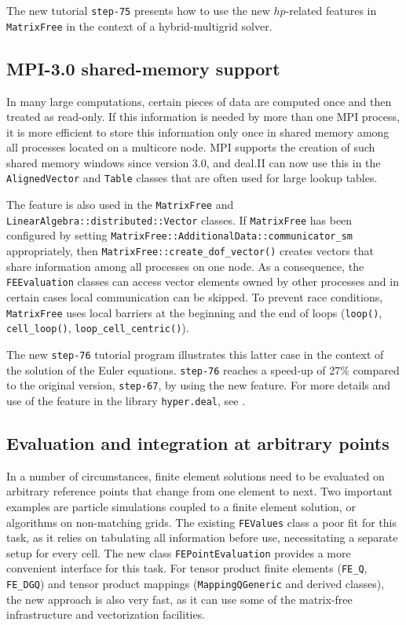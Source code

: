 \documentclass{ansarticle-preprint}
\begin{document}
The new tutorial \texttt{step-75} presents how to use the new $hp$-related features in \texttt{MatrixFree}
in the context of a hybrid-multigrid solver.



\subsection{MPI-3.0 shared-memory support}
In many large computations, certain pieces of data are computed once
and then treated as read-only. If this information is needed by more
than one MPI process, it is more efficient to store this information only
once in shared memory among all processes located on a multicore
node. MPI supports the creation of such shared memory windows since
version 3.0, and deal.II can now use this in the
\texttt{AlignedVector} and \texttt{Table} classes that are often used
for large lookup tables.

The feature is also used in the \texttt{MatrixFree} and
\texttt{LinearAlgebra::\allowbreak distributed::\allowbreak Vector} classes. If \texttt{MatrixFree} has been configured by setting
\texttt{MatrixFree::AdditionalData::communicator\_sm} appropriately, then
\texttt{MatrixFree::create\_dof\_vector()} creates vectors that share
information among all processes on one node. As a consequence, the
\texttt{FEEvaluation} classes can access vector elements owned by
other processes and in certain cases local
communication can be skipped. To prevent race conditions, \texttt{MatrixFree} uses local
barriers at the beginning and the end of loops (\texttt{loop()}, \texttt{cell\_loop()}, \texttt{loop\_cell\_centric()}).

The new \texttt{step-76} tutorial program illustrates this latter case
in the context of the solution of the Euler equations. \texttt{step-76} reaches a
speed-up of 27\% compared to the
original version, \texttt{step-67}, by using the new feature.
For more details and use of the feature in the library \texttt{hyper.deal}, see \citep{munch2020hyperdeal}.



\subsection{Evaluation and integration at arbitrary points}
\label{subsec:fepointvalues}

In a number of circumstances, finite element solutions need to be evaluated on
arbitrary reference points that change from one element to next. Two important
examples are particle simulations coupled to a finite element solution, or
algorithms on non-matching grids. The existing \texttt{FEValues} class a poor
fit for this task, as it relies on tabulating all information before use,
necessitating a separate setup for every cell. The new class
\texttt{FEPointEvaluation} provides a more convenient interface for this
task. For tensor product finite elements (\texttt{FE\_Q}, \texttt{FE\_DGQ})
and tensor product mappings (\texttt{MappingQGeneric} and derived classes),
the new approach is also very fast, as it can use some of the matrix-free
infrastructure and vectorization facilities.
\end{document}
